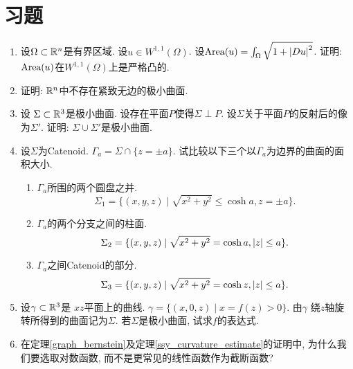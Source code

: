 \chapter{习题}
\begin{enumerate}
    \item 设$\Omega\subset {\mathbb{R}}^n$是有界区域. 设$u \in W^{1,1}(\Omega)$.  设$\text{Area}(u)=\int_\Omega \sqrt{1+{\left | Du \right |}^2}$. 证明: $\text{Area}(u)$在$W^{1,1}(\Omega)$上是严格凸的.
    \item 证明: ${\mathbb{R}}^n$中不存在紧致无边的极小曲面.
    \item 设 $\Sigma \subset {\mathbb{R}}^3$是极小曲面. 设存在平面$P$使得$\Sigma \perp P$. 设$\Sigma$关于平面$P$的反射后的像为$\Sigma'$. 证明: $\Sigma \cup \Sigma'$是极小曲面.
    \item 设$\Sigma$为Catenoid. $\Gamma_a=\Sigma \cap \{z=\pm a\}$. 试比较以下三个以$\Gamma_a$为边界的曲面的面积大小.
    \begin{enumerate}
        \item $\Gamma_a$所围的两个圆盘之并.  
        \begin{equation*}
            \Sigma_1=\{(x,y,z)\mid \sqrt{x^2+y^2} \le \cosh a, z=\pm a\}.
        \end{equation*}
        \item $\Gamma_a$的两个分支之间的柱面. 
        \begin{equation*}
            \Sigma_2=\{(x,y,z)\mid \sqrt{x^2+y^2} = \cosh a, {\left | z \right |} \le a\}.
        \end{equation*}
        \item $\Gamma_a$之间Catenoid的部分. 
        \begin{equation*}
            \Sigma_3=\{(x,y,z)\mid  \sqrt{x^2+y^2}=\cosh z, {\left | z \right |} \le a \}.
        \end{equation*}
    \end{enumerate}
    \item 设$\gamma\subset {\mathbb{R}}^3$是 $xz$平面上的曲线. $\gamma= \{(x,0,z)\mid x=f(z) >0 \}$. 由$\gamma$ 绕$z$轴旋转所得到的曲面记为$\Sigma$. 若$\Sigma$是极小曲面, 试求$f$的表达式.
    \item 在定理\eqref{graph_bernstein}及定理\eqref{ssy_curvature_estimate}的证明中, 为什么我们要选取对数函数, 而不是更常见的线性函数作为截断函数? 

\end{enumerate}
